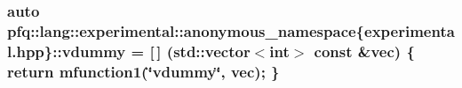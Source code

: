 \hypertarget{namespacepfq_1_1lang_1_1experimental_1_1anonymous__namespace_02experimental_8hpp_03_a2226c8f9da114edfb9d457189dde1cbe}{
\subsubsection[{vdummy}]{\setlength{\rightskip}{0pt plus 5cm}auto pfq\+::lang\+::experimental\+::anonymous\+\_\+namespace\{experimental.\+hpp\}\+::vdummy = \mbox{[}$\,$\mbox{]} (std\+::vector$<$int$>$ const \&vec) \{ return {\bf mfunction1}(\char`\"{}vdummy\char`\"{}, vec); \}}}\label{namespacepfq_1_1lang_1_1experimental_1_1anonymous__namespace_02experimental_8hpp_03_a2226c8f9da114edfb9d457189dde1cbe}
